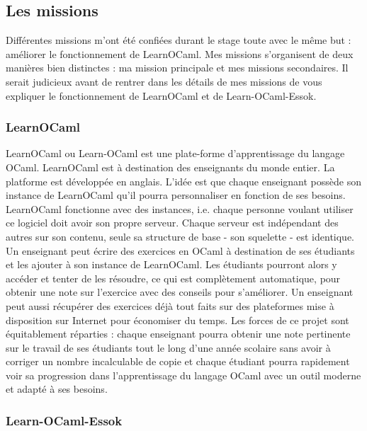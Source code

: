 \documentclass{article}
\begin{document}
\subsection{Les missions}

Différentes missions m'ont été confiées durant le stage toute avec le même but : améliorer le fonctionnement de LearnOCaml.
Mes missions s'organisent de deux manières bien distinctes : ma mission principale et mes missions secondaires.
Il serait judicieux avant de rentrer dans les détails de mes missions de vous expliquer le fonctionnement de LearnOCaml et de Learn-OCaml-Essok.

\subsubsection{LearnOCaml}

LearnOCaml ou Learn-OCaml est une plate-forme d’apprentissage du langage OCaml.
LearnOCaml est à destination des enseignants du monde entier. La platforme est développée en anglais. L'idée est que chaque enseignant possède son instance de LearnOCaml qu'il pourra personnaliser en fonction de ses besoins.
\newline
LearnOCaml fonctionne avec des instances, i.e. chaque personne voulant utiliser ce logiciel doit avoir son propre serveur. Chaque serveur est indépendant des autres sur son contenu, seule sa structure de base - son squelette - est identique.
\newline
Un enseignant peut écrire des exercices en OCaml à destination de ses étudiants et les ajouter à son instance de LearnOCaml. Les étudiants pourront alors y accéder et tenter de les résoudre, ce qui est complètement automatique, pour obtenir une note sur l'exercice avec des conseils pour s'améliorer.
\newline
Un enseignant peut aussi récupérer des exercices déjà tout faits sur des plateformes mise à disposition sur Internet pour économiser du temps.
\newline
Les forces de ce projet sont équitablement réparties : chaque enseignant pourra obtenir une note pertinente sur le travail de ses étudiants tout le long d'une année scolaire sans avoir à corriger un nombre incalculable de copie et chaque étudiant pourra rapidement voir sa progression dans l'apprentissage du langage OCaml avec un outil moderne et adapté à ses besoins.

\subsubsection{Learn-OCaml-Essok}
\end{document}
